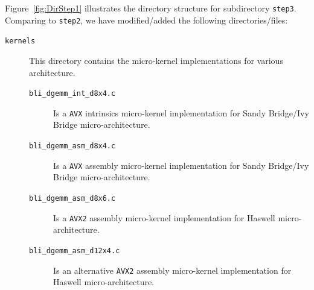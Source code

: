 Figure~\ref{fig:DirStep1} illustrates the directory
structure for subdirectory {\tt step3}. Comparing to {\tt step2}, we have modified/added the following directories/files:

\begin{description}
\item[{\tt kernels}] This directory contains the micro-kernel implementations for various architecture.
\begin{description}
\item[{\tt bli\_dgemm\_int\_d8x4.c}] Is a {\tt AVX} intrinsics micro-kernel implementation for Sandy Bridge/Ivy Bridge micro-architecture.
\item[{\tt bli\_dgemm\_asm\_d8x4.c}] Is a {\tt AVX} assembly micro-kernel implementation for Sandy Bridge/Ivy Bridge micro-architecture.
\item[{\tt bli\_dgemm\_asm\_d8x6.c}] Is a {\tt AVX2} assembly micro-kernel implementation for Haswell micro-architecture.
\item[{\tt bli\_dgemm\_asm\_d12x4.c}] Is an alternative {\tt AVX2} assembly micro-kernel implementation for Haswell micro-architecture.
\end{description}
\end{description}


